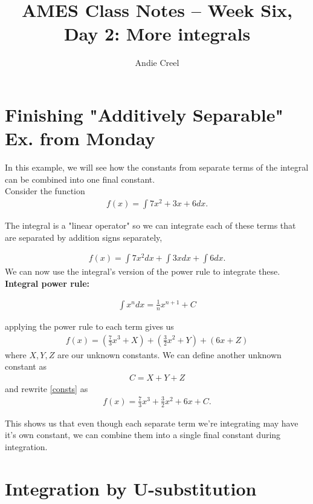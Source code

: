 \documentclass{article}
\title{AMES Class Notes -- Week Six, Day 2: More integrals}
\author{Andie Creel}
\begin{document}
\maketitle

\section{Finishing "Additively Separable" Ex. from Monday}

In this example, we will see how the constants from separate terms of the integral can be combined into one final constant. \\

Consider the function 
\begin{align}
    f(x) = \int 7x^2 + 3x +6 dx.
\end{align}

The integral is a "linear operator" so we can integrate each of these terms that are separated by addition signs separately, 

\begin{align}
    f(x) = \int 7x^2 dx + \int 3x dx +\int 6dx.
\end{align}
We can now use the integral's version of the power rule to integrate these. \\

\textbf{Integral power rule:}

\begin{align}
    \int x^n dx = \frac{1}{n}x^{n+1} + C
\end{align}

applying the power rule to each term gives us 
\begin{align}
    f(x) = (\frac{7}{3} x^3 + X) + (\frac{3}{2} x^2 + Y) + (6x + Z) \label{consts}
\end{align}
where $X, Y, Z$ are our unknown constants. We can define another unknown constant as 
\begin{align}
    C = X + Y + Z 
\end{align}
and rewrite \ref{consts} as 
\begin{align}
    f(x) = \frac{7}{3} x^3  + \frac{3}{2} x^2 + 6x + C. 
\end{align}

This shows us that even though each separate term we're integrating may have it's own constant, we can combine them into a single final constant during integration. 


\section{Integration by U-substitution}
\end{document}

